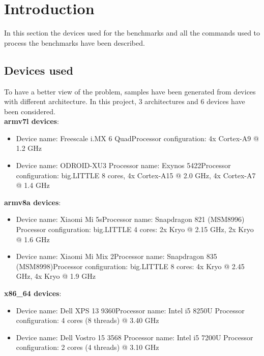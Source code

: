 \section{Introduction}

In this section the devices used for the benchmarks and all the commands used to process the benchmarks have been described.

\subsection{Devices used}

To have a better view of the problem, samples have been generated from devices with different architecture.
In this project, 3 architectures and 6 devices have been considered.\\
\textbf{armv7l devices}:
\begin{itemize}
	\item Device name: Freescale i.MX 6 Quad\newline Processor configuration: 4x Cortex-A9 @ 1.2 GHz
	\item Device name: ODROID-XU3 \newline Processor name: Exynos 5422\newline Processor configuration: big.LITTLE 8 cores, 4x Cortex-A15 @ 2.0 GHz, 4x Cortex-A7 @ 1.4 GHz 
\end{itemize}
\textbf{armv8a devices}:
\begin{itemize}
	\item Device name: Xiaomi Mi 5s\newline Processor name: Snapdragon 821 (MSM8996) \newline Processor configuration: big.LITTLE 4 cores: 2x Kryo @ 2.15 GHz, 2x Kryo @ 1.6 GHz
	\item Device name: Xiaomi Mi Mix 2\newline Processor name: Snapdragon 835 (MSM8998)\newline Processor configuration: big.LITTLE 8 cores: 4x Kryo @ 2.45 GHz, 4x Kryo @ 1.9 GHz
\end{itemize}
\textbf{x86\_64 devices}:
\begin{itemize}
	\item Device name: Dell XPS 13 9360\newline Processor name: Intel i5 8250U \newline Processor configuration: 4 cores (8 threads) @ 3.40 GHz
	\item Device name: Dell Vostro 15 3568 \newline Processor name: Intel i5 7200U
	\newline Processor configuration: 2 cores (4 threads) @ 3.10 GHz
\end{itemize}
\clearpage
